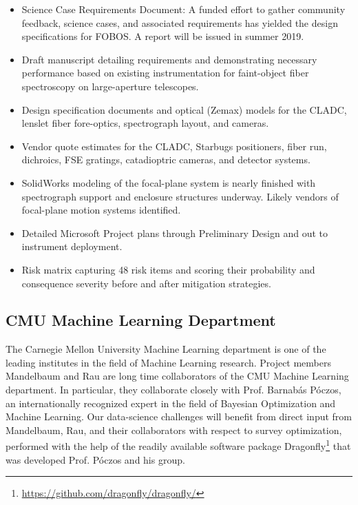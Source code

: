 \documentclass[oneside,11pt]{amsart}
\begin{document}
\begin{itemize}
%
\item Science Case Requirements Document: A funded effort to gather
community feedback, science cases, and associated requirements has
yielded the design specifications for FOBOS.  A report will be issued in
summer 2019.
%
\item Draft manuscript detailing requirements and demonstrating
necessary performance based on existing instrumentation for faint-object
fiber spectroscopy on large-aperture telescopes.
%
\item Design specification documents and optical (Zemax) models for the
CLADC, lenslet fiber fore-optics, spectrograph layout, and cameras.
%
\item Vendor quote estimates for the CLADC, Starbugs positioners, fiber
run, dichroics, FSE gratings, catadioptric cameras, and detector
systems.
%
\item SolidWorks modeling of the focal-plane system is nearly finished
with spectrograph support and enclosure structures underway.  Likely
vendors of focal-plane motion systems identified.
%
\item Detailed Microsoft Project plans through Preliminary Design and
out to instrument deployment.  
%
\item Risk matrix capturing 48 risk items and scoring their probability
and consequence severity before and after mitigation strategies.
%
\end{itemize}


\subsection{CMU Machine Learning Department}

The Carnegie Mellon University Machine Learning department is one of the
leading institutes in the field of Machine Learning research.  Project
members Mandelbaum and Rau are long time collaborators of the CMU
Machine Learning department.  In particular, they collaborate closely
with Prof. Barnab{\'a}s P{\'o}czos, an internationally recognized expert
in the field of Bayesian Optimization and Machine Learning.  Our
data-science challenges will benefit from direct input from Mandelbaum,
Rau, and their collaborators with respect to survey optimization,
performed with the help of the readily available software package
Dragonfly\footnote{\url{https://github.com/dragonfly/dragonfly/}} that
was developed Prof. P{\'o}czos and his group.


\end{document}
